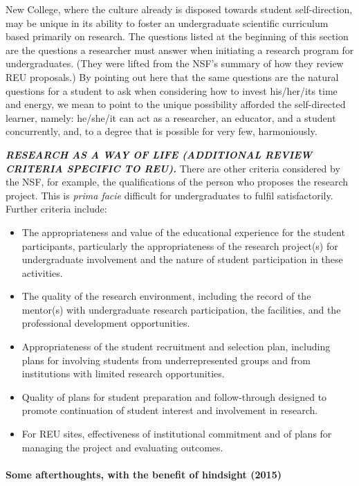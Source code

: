 New College, where the culture already is disposed towards student
self-direction, may be unique in its ability to foster an undergraduate
scientific curriculum based primarily on research. The questions listed
at the beginning of this section are the questions a researcher must
answer when initiating a research program for undergraduates. (They were
lifted from the NSF's summary of how they review REU proposals.) By
pointing out here that the same questions are the natural questions for
a student to ask when considering how to invest his/her/its time and
energy, we mean to point to the unique possibility afforded the
self-directed learner, namely: he/she/it can act as a researcher, an
educator, and a student concurrently, and, to a degree that is possible
for very few, harmoniously.

\noindent\emph{\textbf{RESEARCH AS A WAY OF LIFE (ADDITIONAL REVIEW CRITERIA SPECIFIC
TO REU).}} There are other criteria considered by the NSF, for example,
the qualifications of the person who proposes the research project. This
is \emph{prima facie} difficult for undergraduates to fulfil
satisfactorily. Further criteria include:

\begin{itemize}
\itemsep1pt\parskip0pt
\item
  The appropriateness and value of the educational experience for the
  student participants, particularly the appropriateness of the research
  project(s) for undergraduate involvement and the nature of student
  participation in these activities.
\item
  The quality of the research environment, including the record of the
  mentor(s) with undergraduate research participation, the facilities,
  and the professional development opportunities.
\item
  Appropriateness of the student recruitment and selection plan,
  including plans for involving students from underrepresented groups
  and from institutions with limited research opportunities.
\item
  Quality of plans for student preparation and follow-through designed
  to promote continuation of student interest and involvement in
  research.
\item
  For REU sites, effectiveness of institutional commitment and of plans
  for managing the project and evaluating outcomes.
\end{itemize}

\paragraph{Some afterthoughts, with the benefit of hindsight
(2015)}\label{some-afterthoughts-with-the-benefit-of-hindsight-2015}

